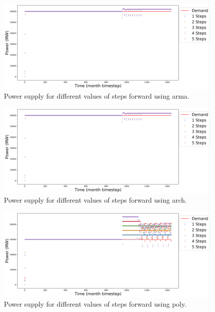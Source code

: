 \documentclass[11pt]{article}
\begin{document}
\begin{figure}[!h]
	\centering
	\includegraphics[width=\textwidth]{23-figures/23-power-buffer0-arma-steps.png} 
	\hfill
	\caption{Power supply for different values of steps forward using arma.}
	\label{fig:23-ste-arma}
\end{figure}

\begin{figure}[!h]
	\centering
	\includegraphics[width=\textwidth]{23-figures/23-power-buffer0-arch-steps.png} 
	\hfill
	\caption{Power supply for different values of steps forward using arch.}
	\label{fig:23-ste-arch}
\end{figure}

\begin{figure}[!h]
	\centering
	\includegraphics[width=\textwidth]{23-figures/23-power-buffer0-poly-steps.png} 
	\hfill
	\caption{Power supply for different values of steps forward using poly.}
	\label{fig:23-ste-poly}
\end{figure}
\end{document}

